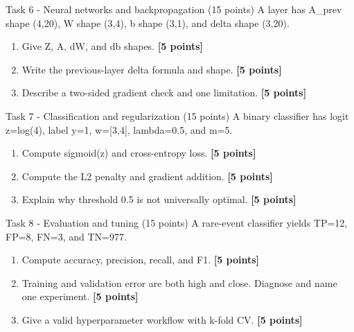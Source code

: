 \documentclass[aspectratio=169,11pt]{beamer}
\begin{document}
\begin{frame}{Task 6 - Neural networks and backpropagation (15 points)}
\small
A layer has A\_prev shape (4,20), W shape (3,4), b shape (3,1), and delta shape (3,20).

\vspace{0.2cm}
\begin{enumerate}
\item[\textbf{a.}] Give Z, A, dW, and db shapes. \hfill{\color{courseblue}\textbf{[5 points]}}
\item[\textbf{b.}] Write the previous-layer delta formula and shape. \hfill{\color{courseblue}\textbf{[5 points]}}
\item[\textbf{c.}] Describe a two-sided gradient check and one limitation. \hfill{\color{courseblue}\textbf{[5 points]}}
\end{enumerate}
\end{frame}

\begin{frame}{Task 7 - Classification and regularization (15 points)}
\small
A binary classifier has logit z=log(4), label y=1, w=[3,4], lambda=0.5, and m=5.

\vspace{0.2cm}
\begin{enumerate}
\item[\textbf{a.}] Compute sigmoid(z) and cross-entropy loss. \hfill{\color{courseblue}\textbf{[5 points]}}
\item[\textbf{b.}] Compute the L2 penalty and gradient addition. \hfill{\color{courseblue}\textbf{[5 points]}}
\item[\textbf{c.}] Explain why threshold 0.5 is not universally optimal. \hfill{\color{courseblue}\textbf{[5 points]}}
\end{enumerate}
\end{frame}

\begin{frame}{Task 8 - Evaluation and tuning (15 points)}
\small
A rare-event classifier yields TP=12, FP=8, FN=3, and TN=977.

\vspace{0.2cm}
\begin{enumerate}
\item[\textbf{a.}] Compute accuracy, precision, recall, and F1. \hfill{\color{courseblue}\textbf{[5 points]}}
\item[\textbf{b.}] Training and validation error are both high and close. Diagnose and name one experiment. \hfill{\color{courseblue}\textbf{[5 points]}}
\item[\textbf{c.}] Give a valid hyperparameter workflow with k-fold CV. \hfill{\color{courseblue}\textbf{[5 points]}}
\end{enumerate}
\end{frame}
\end{document}
